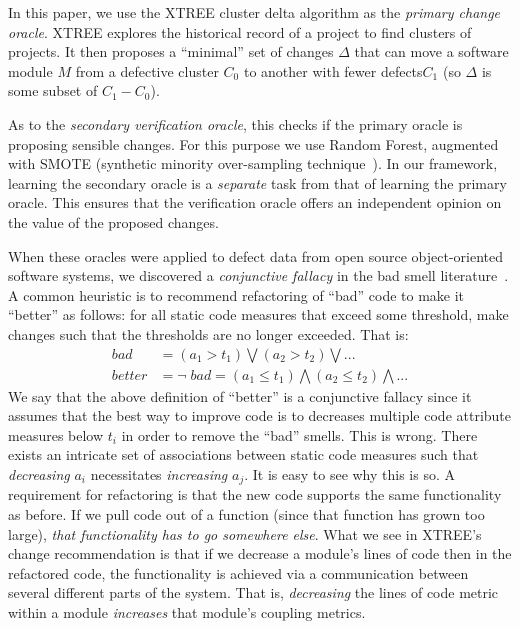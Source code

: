 \documentclass[twocolumn,5p]{elsarticle}
\theoremstyle{break}
\begin{document}
In this paper, we use 
the XTREE cluster delta algorithm as the {\em primary change  oracle}.
XTREE 
explores the historical record of a project to find clusters of projects.
It then proposes a ``minimal'' set of changes $\Delta$ that can move a software module $M$ from a defective cluster $C_0$ to another with fewer defects$C_1$ (so $\Delta$
is some subset of $C_1 - C_0$). %

As to 
the {\em secondary verification oracle}, this  checks if the primary oracle is proposing
sensible changes. For this purpose we use Random Forest\cite{breiman2001random}, augmented with SMOTE (synthetic  minority over-sampling technique~\cite{chawla2002smote}).
 In our framework,  learning
the secondary oracle is   a {\em separate} task from that of learning the primary
oracle. This  ensures that the verification oracle offers an independent
opinion on the value of the proposed changes.

When these oracles were applied to defect data from
open source object-oriented software systems, we discovered a {\em conjunctive fallacy}
in the bad smell literature~\cite{erni96,bender99,Shatnawi10,Alves2010,hermans15}.
A common heuristic is to recommend refactoring of ``bad'' code
to make it ``better''   as follows: for all static code measures that exceed some threshold, make changes such that the thresholds are no longer exceeded. That is:
\begin{equation}\label{eq:df}
\scriptstyle
\begin{array}{rl}
\mathit{bad} & = \left(a_1 > t_1 \right) \bigvee \left(a_2 > t_2\right) \bigvee    ... \\
\mathit{better} & = \neg\;\mathit{bad} = \left(a_1 \le t_1 \right) \bigwedge \left(a_2 \le t_2\right)  \bigwedge  ...
\end{array}
\end{equation}
We say that the above definition of ``better'' is a conjunctive fallacy
since it assumes that the best way to improve code is to decreases multiple code attribute measures below $t_i$ in order
to remove the ``bad'' smells. This is wrong.  
There exists an intricate set of associations between static code measures
such that {\em decreasing}  $a_i$ necessitates {\em increasing} $a_j$.
It is easy to see why this is so.
A requirement for  refactoring is that the new code supports the same functionality
as before. If we pull code out of a function (since that function has grown too
large), {\em that functionality has to go somewhere else}. What we see in XTREE's change
recommendation is that if we decrease a module's lines of code  then in the refactored
code, the functionality is achieved via a communication between several different parts
of the system. That is, {\em decreasing} the lines of code metric within a module {\em increases}
that module's coupling metrics.
\end{document}
